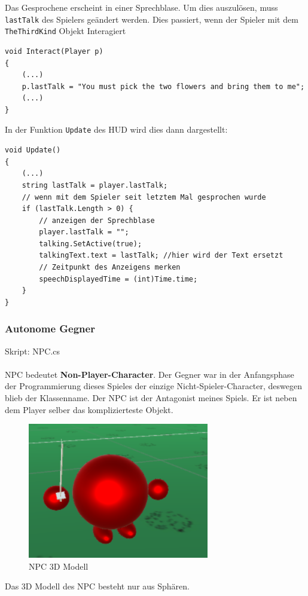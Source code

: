 Das Gesprochene erscheint in einer Sprechblase. Um dies auszulösen, muss \lstinline{lastTalk} des Spielers geändert werden.
Dies passiert, wenn der Spieler mit dem \lstinline{TheThirdKind} Objekt Interagiert 
\begin{lstlisting}[caption={Setzen des Sprechinhaltes}]
void Interact(Player p)
{
	(...)
	p.lastTalk = "You must pick the two flowers and bring them to me";
	(...)
}
\end{lstlisting}

In der Funktion \lstinline{Update} des HUD wird dies dann dargestellt:
 
\begin{lstlisting}[caption={Gesprochenes aktualisieren}]
void Update()
{
	(...)
	string lastTalk = player.lastTalk;
	// wenn mit dem Spieler seit letztem Mal gesprochen wurde
	if (lastTalk.Length > 0) {
		// anzeigen der Sprechblase
		player.lastTalk = "";
		talking.SetActive(true);
		talkingText.text = lastTalk; //hier wird der Text ersetzt
		// Zeitpunkt des Anzeigens merken
		speechDisplayedTime = (int)Time.time;
	} 
}
\end{lstlisting}


\subsubsection{Autonome Gegner}
\label{subsubsec:npc}
Skript: NPC.cs\\\\
NPC bedeutet \textbf{Non-Player-Character}. Der Gegner war in der Anfangsphase der Programmierung dieses Spieles der einzige Nicht-Spieler-Character, deswegen blieb der Klassenname. Der NPC ist der Antagonist meines Spiels.
Er ist neben dem Player selber das komplizierteste Objekt.

\begin{figure}[H]
\includegraphics[scale=1]{screenshots/npc.png}
\caption{NPC 3D Modell}
\end{figure}
Das 3D Modell des NPC besteht nur aus Sphären.

